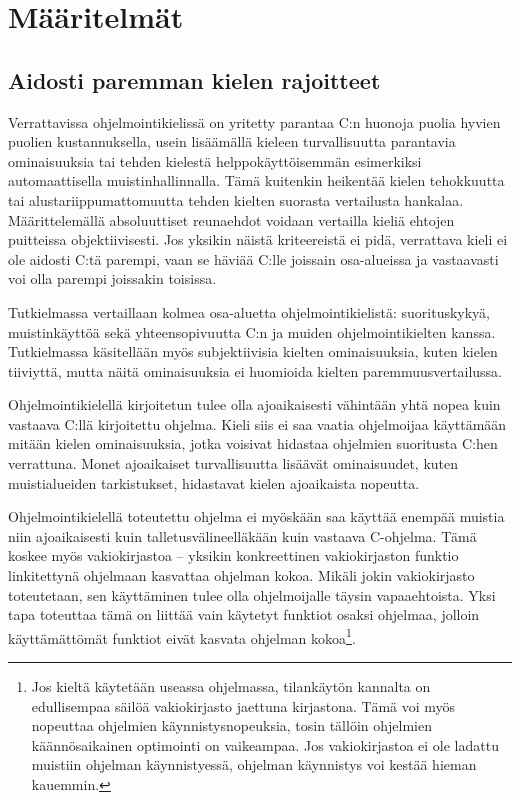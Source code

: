 \section{Määritelmät} 

\subsection{Aidosti paremman kielen rajoitteet}
\label{sec:abs}

Verrattavissa ohjelmointikielissä on yritetty parantaa C:n huonoja puolia
hyvien puolien kustannuksella, usein lisäämällä kieleen turvallisuutta
parantavia ominaisuuksia tai tehden kielestä helppokäyttöisemmän esimerkiksi
automaattisella muistinhallinnalla. Tämä kuitenkin heikentää kielen tehokkuutta
tai alustariippumattomuutta tehden kielten suorasta vertailusta hankalaa.
Määrittelemällä absoluuttiset reunaehdot voidaan vertailla kieliä
ehtojen puitteissa objektiivisesti. Jos yksikin näistä kriteereistä ei pidä,
verrattava kieli ei ole aidosti C:tä parempi, vaan se häviää C:lle joissain
osa-alueissa ja vastaavasti voi olla parempi joissakin toisissa.

Tutkielmassa vertaillaan kolmea osa-aluetta ohjelmointikielistä: suorituskykyä,
muistinkäyttöä sekä yhteensopivuutta C:n ja muiden ohjelmointikielten kanssa.
Tutkielmassa käsitellään myös subjektiivisia kielten ominaisuuksia, kuten
kielen tiiviyttä, mutta näitä
ominaisuuksia ei huomioida kielten paremmuusvertailussa.

Ohjelmointikielellä kirjoitetun tulee olla ajoaikaisesti vähintään yhtä nopea
kuin vastaava C:llä kirjoitettu ohjelma. Kieli siis ei saa vaatia ohjelmoijaa
käyttämään mitään kielen ominaisuuksia, jotka voisivat hidastaa ohjelmien
suoritusta C:hen verrattuna. Monet ajoaikaiset turvallisuutta lisäävät
ominaisuudet, kuten muistialueiden tarkistukset, hidastavat kielen ajoaikaista
nopeutta.

Ohjelmointikielellä toteutettu ohjelma ei myöskään saa käyttää enempää muistia
niin ajoaikaisesti kuin talletusvälineelläkään kuin vastaava C-ohjelma. Tämä
koskee myös vakiokirjastoa -- yksikin konkreettinen
vakiokirjaston funktio linkitettynä ohjelmaan kasvattaa ohjelman kokoa. Mikäli
jokin vakiokirjasto toteutetaan, sen käyttäminen tulee olla ohjelmoijalle
täysin vapaaehtoista. Yksi tapa toteuttaa tämä on liittää vain käytetyt
funktiot osaksi ohjelmaa, jolloin käyttämättömät funktiot eivät kasvata
ohjelman kokoa\footnote{Jos kieltä käytetään useassa ohjelmassa, tilankäytön
kannalta on edullisempaa säilöä vakiokirjasto jaettuna kirjastona. Tämä voi
myös nopeuttaa ohjelmien käynnistysnopeuksia, tosin tällöin ohjelmien
käännösaikainen optimointi on vaikeampaa. Jos vakiokirjastoa ei ole ladattu
muistiin ohjelman käynnistyessä, ohjelman käynnistys voi kestää hieman
kauemmin.}.

